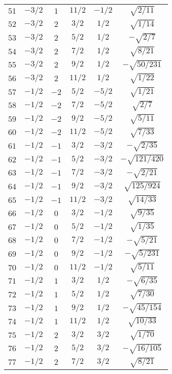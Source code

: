 \begin{table}
\begin{center}
\begin{tabular}{|c|c|c|c|c|c|}
$51$ & $-3/2$ & $1$ & $11/2$ & $-1/2$ & $\sqrt{2/11}$ \\ 
$52$ & $-3/2$ & $2$ & $3/2$ & $1/2$ & $\sqrt{1/14}$ \\ 
$53$ & $-3/2$ & $2$ & $5/2$ & $1/2$ & $-\sqrt{2/7}$ \\ 
$54$ & $-3/2$ & $2$ & $7/2$ & $1/2$ & $\sqrt{8/21}$ \\ 
$55$ & $-3/2$ & $2$ & $9/2$ & $1/2$ & $-\sqrt{50/231}$ \\ 
$56$ & $-3/2$ & $2$ & $11/2$ & $1/2$ & $\sqrt{1/22}$ \\ 
$57$ & $-1/2$ & $-2$ & $5/2$ & $-5/2$ & $\sqrt{1/21}$ \\ 
$58$ & $-1/2$ & $-2$ & $7/2$ & $-5/2$ & $\sqrt{2/7}$ \\ 
$59$ & $-1/2$ & $-2$ & $9/2$ & $-5/2$ & $\sqrt{5/11}$ \\ 
$60$ & $-1/2$ & $-2$ & $11/2$ & $-5/2$ & $\sqrt{7/33}$ \\ 
$61$ & $-1/2$ & $-1$ & $3/2$ & $-3/2$ & $-\sqrt{2/35}$ \\ 
$62$ & $-1/2$ & $-1$ & $5/2$ & $-3/2$ & $-\sqrt{121/420}$ \\ 
$63$ & $-1/2$ & $-1$ & $7/2$ & $-3/2$ & $-\sqrt{2/21}$ \\ 
$64$ & $-1/2$ & $-1$ & $9/2$ & $-3/2$ & $\sqrt{125/924}$ \\ 
$65$ & $-1/2$ & $-1$ & $11/2$ & $-3/2$ & $\sqrt{14/33}$ \\ 
$66$ & $-1/2$ & $0$ & $3/2$ & $-1/2$ & $\sqrt{9/35}$ \\ 
$67$ & $-1/2$ & $0$ & $5/2$ & $-1/2$ & $\sqrt{1/35}$ \\ 
$68$ & $-1/2$ & $0$ & $7/2$ & $-1/2$ & $-\sqrt{5/21}$ \\ 
$69$ & $-1/2$ & $0$ & $9/2$ & $-1/2$ & $-\sqrt{5/231}$ \\ 
$70$ & $-1/2$ & $0$ & $11/2$ & $-1/2$ & $\sqrt{5/11}$ \\ 
$71$ & $-1/2$ & $1$ & $3/2$ & $1/2$ & $-\sqrt{6/35}$ \\ 
$72$ & $-1/2$ & $1$ & $5/2$ & $1/2$ & $\sqrt{7/30}$ \\ 
$73$ & $-1/2$ & $1$ & $9/2$ & $1/2$ & $-\sqrt{45/154}$ \\ 
$74$ & $-1/2$ & $1$ & $11/2$ & $1/2$ & $\sqrt{10/33}$ \\ 
$75$ & $-1/2$ & $2$ & $3/2$ & $3/2$ & $\sqrt{1/70}$ \\ 
$76$ & $-1/2$ & $2$ & $5/2$ & $3/2$ & $-\sqrt{16/105}$ \\ 
$77$ & $-1/2$ & $2$ & $7/2$ & $3/2$ & $\sqrt{8/21}$ \\ 

\end{tabular}
\end{center}
\end{table}
